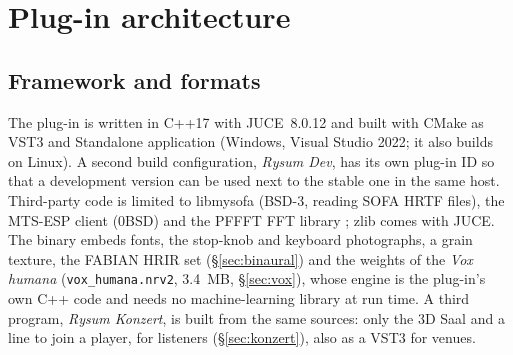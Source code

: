 \documentclass[11pt,a4paper,parskip=half,DIV=11,toc=bibliography]{scrartcl}
\newcommand{\ui}[1]{\emph{#1}}                 %
\newcommand{\fn}[1]{\mbox{\texttt{#1}}}
\begin{document}
\section{Plug-in architecture}
\label{sec:architecture}

\subsection{Framework and formats}
The plug-in is written in C++17 with JUCE~8.0.12 \citep{juce} and built with CMake as VST3 and
Standalone application (Windows, Visual Studio 2022; it also builds on Linux). A second build
configuration, \emph{Rysum Dev}, has its own plug-in ID so that a development version can be used next
to the stable one in the same host. Third-party code is limited to libmysofa \citep{libmysofa}
(BSD-3, reading SOFA HRTF files), the MTS-ESP client \citep{mtsesp} (0BSD) and the PFFFT FFT library
\citep{pffft}; zlib comes with JUCE.
The binary embeds fonts, the stop-knob and keyboard photographs, a grain texture, the FABIAN HRIR
set (\S\ref{sec:binaural}) and the weights of the \ui{Vox humana} (\fn{vox\_humana.nrv2}, \SI{3.4}{MB}, \S\ref{sec:vox}), whose engine is the
plug-in's own C++ code and needs no machine-learning library at run time. A third program, \emph{Rysum Konzert}, is built from the same sources: only
the 3D Saal and a line to join a player, for listeners (\S\ref{sec:konzert}), also as a VST3 for venues.
\end{document}
